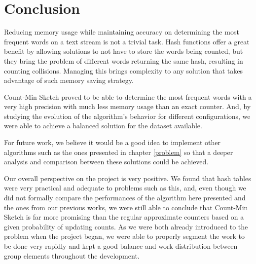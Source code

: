 \documentclass[shortpaper]{revdetua}
\begin{document}

\section{Conclusion}

Reducing memory usage while maintaining accuracy on determining the most frequent words on a text stream is not a trivial task.
Hash functions offer a great benefit by allowing solutions to not have to store the words being counted, but they bring the problem of different words 
returning the same hash, resulting in counting collisions.
Managing this brings complexity to any solution that takes advantage of such memory saving strategy.

Count-Min Sketch proved to be able to determine the most frequent words with a very high precision with much less memory usage than an exact counter.
And, by studying the evolution of the algorithm's behavior for different configurations, we were able to achieve a balanced solution for the dataset available.

For future work, we believe it would be a good idea to implement other algorithms such as the ones presented in chapter \ref{problem} so that a deeper analysis 
and comparison between these solutions could be achieved.

Our overall perspective on the project is very positive.
We found that hash tables were very practical and adequate to problems such as this, and, even though we did not formally compare the performances of the 
algorithm here presented and the ones from our previous works, we were still able to conclude that Count-Min Sketch is far more promising than the regular 
approximate counters based on a given probability of updating counts.
As we were both already introduced to the problem when the project began, we were able to properly segment the work to be done very rapidly and kept a good 
balance and work distribution between group elements throughout the development.


 

\newpage
\appendix
\end{document}
